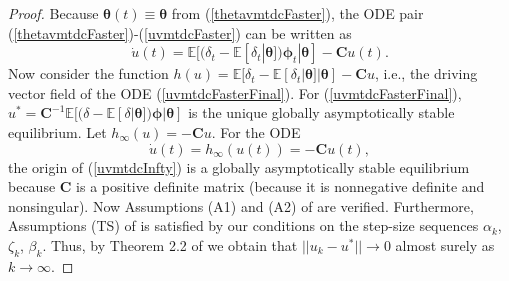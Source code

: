\begin{proof}
    Because ${\bm{\theta}}(t)\equiv {\bm{\theta}}$ from (\ref{thetavmtdcFaster}), the ODE pair (\ref{thetavmtdcFaster})-(\ref{uvmtdcFaster})
    can be written as 
    \begin{equation}
     \dot{{u}}(t) = \mathbb{E}[(\delta_t-\mathbb{E}[\delta_t|{\bm{\theta}}]){\bm{\phi}}_t|{\bm{\theta}}] - \textbf{C}{u}(t).
        \label{uvmtdcFasterFinal}
    \end{equation}
    Now consider the function $h({u})=\mathbb{E}[\delta_t-\mathbb{E}[\delta_t|{\bm{\theta}}]|{\bm{\theta}}] -\textbf{C}{u}$, i.e., the
    driving vector field of the ODE (\ref{uvmtdcFasterFinal}). For (\ref{uvmtdcFasterFinal}),
    ${u}^* = \textbf{C}^{-1}\mathbb{E}[(\delta-\mathbb{E}[\delta|{\bm{\theta}}]){\bm{\phi}}|{\bm{\theta}}]$ is the unique globally asymptotically
    stable equilibrium. Let $h_{\infty}({u})=-\textbf{C}{u}$.
    For the ODE
    \begin{equation}
     \dot{{u}}(t) = h_{\infty}({u}(t))= -\textbf{C}{u}(t),
        \label{uvmtdcInfty}
    \end{equation}
    the origin of (\ref{uvmtdcInfty}) is a globally asymptotically stable
    equilibrium because $\textbf{C}$ is a positive definite matrix (because it is nonnegative definite and nonsingular).
    Now Assumptions (A1) and (A2) of \cite{borkar2000ode} are verified.
    Furthermore, Assumptions (TS) of \cite{borkar2000ode} is satisfied by our
    conditions on the step-size sequences $\alpha_k$,$\zeta_k$, $\beta_k$. Thus,
    by Theorem 2.2 of \cite{borkar2000ode} we obtain that
    $||{u}_k-{u}^*||\rightarrow 0$ almost surely as $k\rightarrow \infty$.
    

\end{proof}
